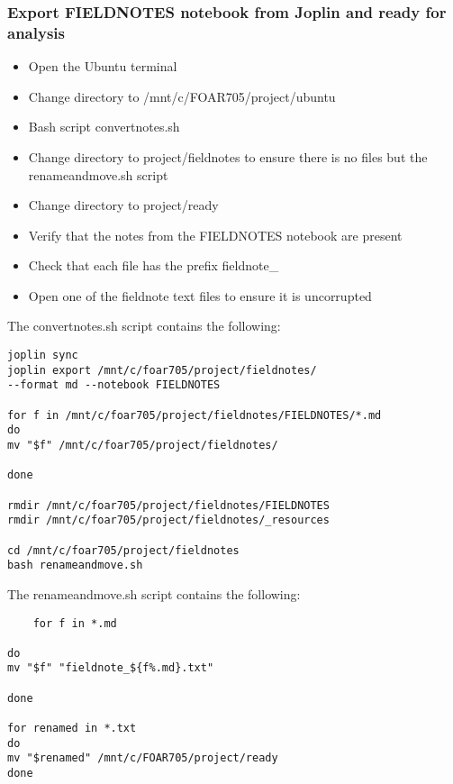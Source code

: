 \documentclass{article}
\begin{document}
\subsubsection{Export FIELDNOTES notebook from Joplin and ready for analysis}
\begin{itemize}
    \item Open the Ubuntu terminal
    \item Change directory to /mnt/c/FOAR705/project/ubuntu
    \item Bash script convertnotes.sh
    \item Change directory to project/fieldnotes to ensure there is no files but the renameandmove.sh script
    \item Change directory to project/ready
    \item Verify that the notes from the FIELDNOTES notebook are present
    \item Check that each file has the prefix fieldnote\_
    \item Open one of the fieldnote text files to ensure it is uncorrupted
\end{itemize}

The convertnotes.sh script contains the following:
\begin{verbatim}
joplin sync
joplin export /mnt/c/foar705/project/fieldnotes/ 
--format md --notebook FIELDNOTES

for f in /mnt/c/foar705/project/fieldnotes/FIELDNOTES/*.md
do
mv "$f" /mnt/c/foar705/project/fieldnotes/

done

rmdir /mnt/c/foar705/project/fieldnotes/FIELDNOTES
rmdir /mnt/c/foar705/project/fieldnotes/_resources

cd /mnt/c/foar705/project/fieldnotes
bash renameandmove.sh

\end{verbatim}
The renameandmove.sh script contains the following:
\begin{verbatim}
    for f in *.md

do
mv "$f" "fieldnote_${f%.md}.txt"

done

for renamed in *.txt
do
mv "$renamed" /mnt/c/FOAR705/project/ready
done

\end{verbatim}
\end{document}
